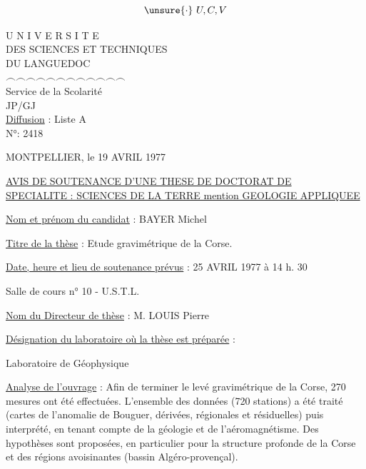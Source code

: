 \[
\unsure{\cdot}\ U,C,V
\]
\begingroup\ttfamily

\noindent
\begin{minipage}[t]{.48\linewidth}\centering
U N I V E R S I T E\\
DES SCIENCES ET TECHNIQUES\\
DU LANGUEDOC\\
{\footnotesize $\frown\frown\frown\frown\frown\frown\frown\frown\frown\frown\frown\frown$}\\[.6em]
Service de la Scolarité\\
JP/GJ\\[.5em]
\uline{Diffusion} : Liste A\\
N°: 2418
\end{minipage}\hfill
\begin{minipage}[t]{.49\linewidth}\raggedleft
MONTPELLIER, le 19 AVRIL 1977\\
\end{minipage}

\begin{center}
\uline{AVIS DE SOUTENANCE D'UNE THESE DE DOCTORAT DE}\\[.5em]
\uline{SPECIALITE : SCIENCES DE LA TERRE mention GEOLOGIE APPLIQUEE}
\end{center}

\uline{Nom et prénom du candidat} : BAYER Michel

\uline{Titre de la thèse} : Etude gravimétrique de la Corse.

\uline{Date, heure et lieu de soutenance prévus} : 25 AVRIL 1977 à 14 h. 30

\hspace*{3em}Salle de cours n° 10 - U.S.T.L.

\uline{Nom du Directeur de thèse} : M. LOUIS Pierre

\uline{Désignation du laboratoire où la thèse est préparée} :

\hspace*{3em}Laboratoire de Géophysique

\uline{Analyse de l'ouvrage} : Afin de terminer le levé gravimétrique de la Corse, 270 mesures ont été effectuées. L'ensemble des données (720 stations) a été traité (cartes de l'anomalie de Bouguer, dérivées, régionales et résiduelles) puis interprété, en tenant compte de la géologie et de l'aéromagnétisme. Des hypothèses sont proposées, en particulier pour la structure profonde de la Corse et des régions avoisinantes (bassin Algéro-provençal).

